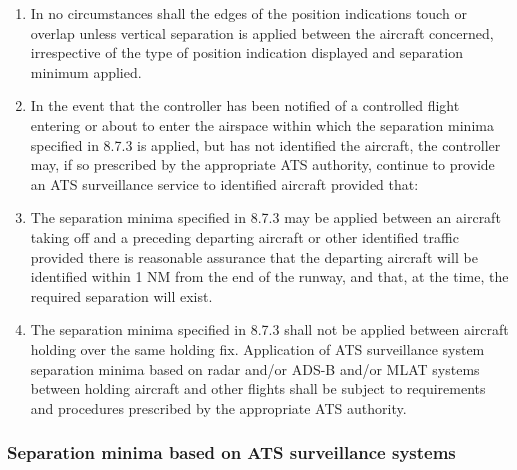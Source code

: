 \begin{enumerate}
    \item In no circumstances shall the edges of the position indications touch or overlap unless vertical separation is applied between the aircraft concerned, irrespective of the type of position indication displayed and separation minimum applied.
    \item In the event that the controller has been notified of a controlled flight entering or about to enter the airspace within which the separation minima specified in 8.7.3 is applied, but has not identified the aircraft, the controller may, if so prescribed by the appropriate ATS authority, continue to provide an ATS surveillance service to identified aircraft provided that:
    

    \item The separation minima specified in 8.7.3 may be applied between an aircraft taking off and a preceding departing aircraft or other identified traffic provided there is reasonable assurance that the departing aircraft will be identified within 1 NM from the end of the runway, and that, at the time, the required separation will exist.
    \item The separation minima specified in 8.7.3 shall not be applied between aircraft holding over the same holding fix. Application of ATS surveillance system separation minima based on radar and/or ADS-B and/or MLAT systems between holding aircraft and other flights shall be subject to requirements and procedures prescribed by the appropriate ATS authority.
\end{enumerate}

\subsubsection{Separation minima based on ATS surveillance systems}

